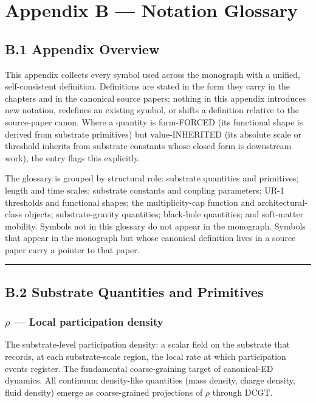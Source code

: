 \documentclass[11pt]{book}
\begin{document}
\newpage

\chapter{Appendix B --- Notation Glossary}
\label{app:B}

\section{B.1 Appendix Overview}

This appendix collects every symbol used across the monograph with a unified, self-consistent definition. Definitions are stated in the form they carry in the chapters and in the canonical source papers; nothing in this appendix introduces new notation, redefines an existing symbol, or shifts a definition relative to the source-paper canon. Where a quantity is form-FORCED (its functional shape is derived from substrate primitives) but value-INHERITED (its absolute scale or threshold inherits from substrate constants whose closed form is downstream work), the entry flags this explicitly.

The glossary is grouped by structural role: substrate quantities and primitives; length and time scales; substrate constants and coupling parameters; UR-1 thresholds and functional shapes; the multiplicity-cap function and architectural-class objects; substrate-gravity quantities; black-hole quantities; and soft-matter mobility. Symbols not in this glossary do not appear in the monograph. Symbols that appear in the monograph but whose canonical definition lives in a source paper carry a pointer to that paper.

\bigskip\hrule\bigskip

\section{B.2 Substrate Quantities and Primitives}

\subsection{$\rho$ — Local participation density}

The substrate-level participation density: a scalar field on the substrate that records, at each substrate-scale region, the local rate at which participation events register. The fundamental coarse-graining target of canonical-ED dynamics. All continuum density-like quantities (mass density, charge density, fluid density) emerge as coarse-grained projections of $\rho$ through DCGT.
\end{document}
